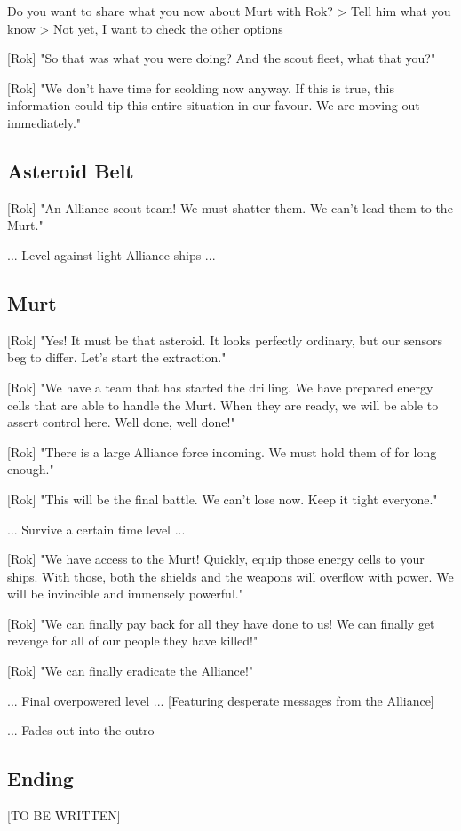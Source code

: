 \documentclass[a4paper,12pt]{article}
\begin{document}
Do you want to share what you now about Murt with Rok?
> Tell him what you know
> Not yet, I want to check the other options

[Rok] "So that was what you were doing? And the scout fleet, what that you?"

[Rok] "We don't have time for scolding now anyway. If this is true, this information could tip this entire situation in our favour.
We are moving out immediately."

\subsection{Asteroid Belt}

[Rok] "An Alliance scout team! We must shatter them. We can't lead them to the Murt."

... Level against light Alliance ships ...

\subsection{Murt}

[Rok] "Yes! It must be that asteroid. It looks perfectly ordinary, but our sensors beg to differ. Let's start the extraction."

[Rok] "We have a team that has started the drilling. We have prepared energy cells that are able to handle the Murt.
When they are ready, we will be able to assert control here. Well done, well done!"

[Rok] "There is a large Alliance force incoming. We must hold them of for long enough."

[Rok] "This will be the final battle. We can't lose now. Keep it tight everyone."

... Survive a certain time level ...

[Rok] "We have access to the Murt! Quickly, equip those energy cells to your ships. With those, both the shields and the
weapons will overflow with power. We will be invincible and immensely powerful."

[Rok] "We can finally pay back for all they have done to us! We can finally get revenge for all of our people they have killed!"

[Rok] "We can finally eradicate the Alliance!" 

... Final overpowered level ... [Featuring desperate messages from the Alliance]

... Fades out into the outro

\subsection{Ending}

[TO BE WRITTEN]
\end{document}
